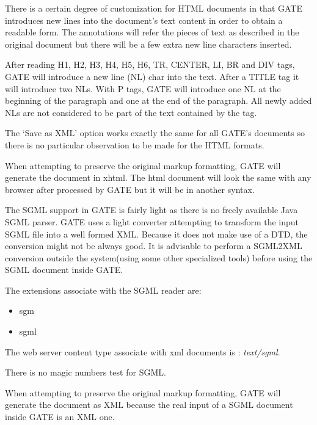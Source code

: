 There is a certain degree of customization for HTML documents in
that GATE introduces new lines into the document's text content in
order to obtain a readable form. The annotations will refer the
pieces of text as described in the original document but there
will be a few extra new line characters inserted.

After reading H1, H2, H3, H4, H5, H6, TR, CENTER, LI, BR and DIV tags, GATE will
introduce a new line (NL) char into the text. After a TITLE tag it will
introduce two NLs. With P tags, GATE will introduce one NL at the beginning of the
paragraph and one at the end of the paragraph. All newly added NLs are not
considered to be part of the text contained by the tag.


The `Save as XML' option works exactly the same for all GATE's
documents so there is no particular observation to be made for the
HTML formats.

When attempting to preserve the original markup formatting, GATE
will generate the document in xhtml. The html document will look
the same with any browser after processed by GATE but it will be
in another syntax.




The SGML support in GATE is fairly light as there is no freely
available Java SGML parser. GATE uses a light converter attempting
to transform the input SGML file into a well formed XML. Because
it does not make use of a DTD, the conversion might not be always
good. It is advisable to perform a SGML2XML conversion outside the
system(using some other specialized tools) before using the SGML
document inside GATE.

The extensions associate with the SGML reader are:
\begin{itemize}
\item
sgm
\item
sgml
\end{itemize}

The web server content type associate with xml documents is : {\em
text/sgml}.

There is no  magic numbers test for SGML.


When attempting to preserve the original markup formatting, GATE
will generate the document as XML because the real input of a SGML
document inside GATE is an XML one.


